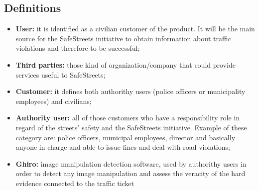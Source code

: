         \subsection{Definitions}
        \begin{itemize}            
            \item \textbf{User:} it is identified as a civilian customer of the
            product. It will be the main source for the SafeStreets initiative
            to obtain information about traffic violations and therefore to be
            successful;
            \item \textbf{Third parties:} those kind of organization/company that
            could provide services useful to SafeStreets; 
            \item \textbf{Customer:} it defines both authorithy users (police
            officers or municipality employees) and civilians; 
            \item \textbf{Authority user:} all of those customers who have a
            responsibility role in regard of the streets' safety and the
            SafeStreets initiative. Example of these category are: police
            officers, municipal employees, director and basically anyone in
            charge and able to issue fines and deal with road violations; 
            \item \textbf{Ghiro:} image manipulation detection software, used by
            authorithy users in order to detect any image manipulation and
            assess the veracity of the hard evidence connected to the traffic
            ticket\\
        \end{itemize}
        
        \newpage
